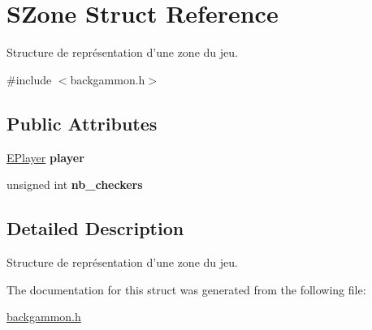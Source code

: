 \hypertarget{structSZone}{
\section{SZone Struct Reference}
\label{structSZone}
}


Structure de représentation d'une zone du jeu.  




{\ttfamily \#include $<$backgammon.h$>$}

\subsection*{Public Attributes}
\begin{DoxyCompactItemize}
\item 
\hypertarget{structSZone_a0acf094dc1e2c4c2ece5524c14faf9a6}{
\hyperlink{backgammon_8h_a30ddbd351c82b617f2a84ae629bd981b}{EPlayer} {\bfseries player}}
\label{structSZone_a0acf094dc1e2c4c2ece5524c14faf9a6}

\item 
\hypertarget{structSZone_af78036256ee9597e935cfa311bcbd42a}{
unsigned int {\bfseries nb\_\-checkers}}
\label{structSZone_af78036256ee9597e935cfa311bcbd42a}

\end{DoxyCompactItemize}


\subsection{Detailed Description}
Structure de représentation d'une zone du jeu. 

The documentation for this struct was generated from the following file:\begin{DoxyCompactItemize}
\item 
\hyperlink{backgammon_8h}{backgammon.h}\end{DoxyCompactItemize}
